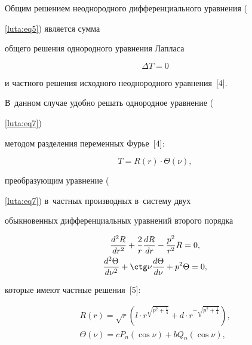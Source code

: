 Общим решением неоднородного дифференциального уравнения ({\ref{luta:eq5}) является сумма

общего решения однородного уравнения Лапласа

\begin{equation}

\label{luta:eq7}

\Delta T=0

\end{equation}

и частного решения исходного неоднородного уравнения~[4].

В~данном случае удобно решать однородное уравнение ({\ref{luta:eq7})

методом разделения переменных Фурье~[4]:

\begin{equation}

\label{luta:eq8}

T=R(r)\cdot \Theta (\nu ),

\end{equation}

преобразующим уравнение ({\ref{luta:eq7}) в~частных производных в~систему двух

обыкновенных дифференциальных уравнений второго порядка

\begin{gather}

\label{luta:eq9}

\frac{d^2R}{dr^2}+\frac2r\frac{dR}{dr}-\frac{p^2}{r^2}R=0,

\\

\label{luta:eq10}

\frac{d^2\Theta }{d\nu ^2}+\ctg\nu \frac{d\Theta }{d\nu }+p^2\Theta =0,

\end{gather}

которые имеют частные решения~[5]:

\begin{gather}

\label{luta:eq11}

R(r)=\sqrt r \left( l\cdot r^{\sqrt {p^2+\frac14}} +d\cdot r^{-\sqrt {p^2+\frac14} } \right),

\\

\label{luta:eq12}

\Theta (\nu )=cP_n (\cos \nu )+bQ_n (\cos \nu ),

\end{gather}

}}}
